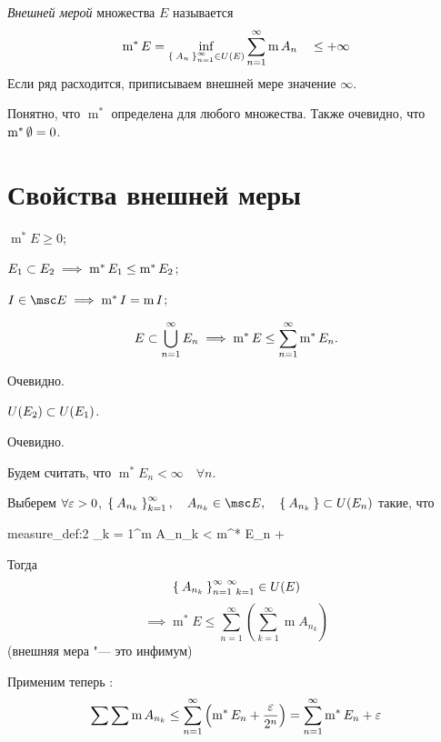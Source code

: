 \begin{definition}
	\emph{Внешней мерой} множества $ E $ называется
	$$ \operatorname m^* E = \inf\limits_{\Set{A_n}_{n = 1}^\infty \in U(E)} \sum_{n = 1}^\infty \operatorname m A_n \quad \le +\infty $$
	Если ряд расходится, приписываем внешней мере значение $ \infty $.
\end{definition}

Понятно, что $ \operatorname m^* $ определена для любого множества. Также очевидно, что $ \operatorname m^* \emptyset = 0 $.

\section{Свойства внешней меры}

\begin{props}
	\item $ \operatorname m^* E \ge 0 $;
	\item $ E_1 \subset E_2 \implies \operatorname m^* E_1 \le \operatorname m^* E_2 $;
	\item $ I \in \msc E \implies \operatorname m^* I = \operatorname m I $;
	\item
	$$ E \subset \bigcup_{n = 1}^\infty E_n \implies \operatorname m^* E \le \sum_{n = 1}^\infty \operatorname m^* E_n. $$
\end{props}

\begin{eproof}
	\item Очевидно.
	\item $ U(E_2) \subset U(E_1) $.
	\item Очевидно.
	\item Будем считать, что $ \operatorname m^* E_n < \infty \quad \forall n $.

	Выберем $ \forall \varepsilon > 0 $, $ \set{A_{n_k}}_{k = 1}^\infty, \quad A_{n_k} \in \msc E, \quad \set{A_{n_k}} \sub U(E_n) $ такие, что
	\begin{equ}{measure_def:2}
		\sum_{k = 1}^\infty \operatorname m A_{n_k} < \operatorname m^* E_n + \frac{}
	\end{equ}
	Тогда
	$$ \Set{A_{n_k}}_{n = 1~k = 1}^{\infty~\infty} \in U(E) $$
	$$ \implies \operatorname m^* E \le \sum_{n = 1}^\infty \left( \sum_{k = 1}^\infty \operatorname mA_{n_k} \right) $$
	(\as внешняя мера "--- это инфимум)

	Применим теперь :
	$$ \sum \sum \operatorname m A_{n_k} \le \sum_{n = 1}^\infty \left( \operatorname m^* E_n + \frac{\varepsilon}{2^n} \right) = \sum_{n = 1}^\infty \operatorname m^* E_n + \varepsilon $$
\end{eproof}

